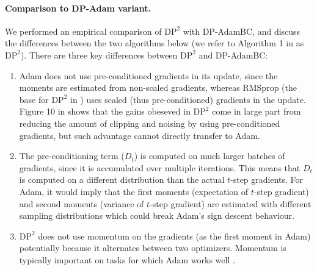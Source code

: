\documentclass[letterpaper]{article} %
\begin{document}
\paragraph{Comparison to DP-Adam variant.}
\label{apdix:compare_dp2}

We performed an empirical comparison of $\textrm{DP}^2$ with DP-AdamBC, and discuss the differences between the two algorithms below (we refer to Algorithm 1 in \citet{lidp2} as $\textrm{DP}^2$). There are three key differences between $\textrm{DP}^2$ and DP-AdamBC:
\begin{enumerate}
    \item Adam does not use pre-conditioned gradients in its update, since the moments are estimated from non-scaled gradients, whereas RMSprop (the base for $\textrm{DP}^2$ in \citet{lidp2}) uses scaled (thus pre-conditioned) gradients in the update. Figure 10 in \citet{lidp2} shows that the gains obeseved in $\textrm{DP}^2$ come in large part from reducing the amount of clipping and noising by using pre-conditioned gradients, but such advantage cannot directly transfer to Adam.
    \item The pre-conditioning term ($D_t$) is computed on much larger batches of gradients, since it is accumulated over multiple iterations. This means that $D_t$ is computed on a different distribution than the actual $t$-step gradients. For Adam, it would imply that the first moments (expectation of $t$-step gradient) and second moments (variance of $t$-step gradient) are estimated with different sampling distributions which could break Adam's sign descent behaviour.
    \item $\textrm{DP}^2$ does not use momentum on the gradients (as the first moment in Adam) potentially because it alternates between two optimizers. Momentum is typically important on tasks for which Adam works well \citep{kunstner2023heavytailed}.
\end{enumerate}
\end{document}
